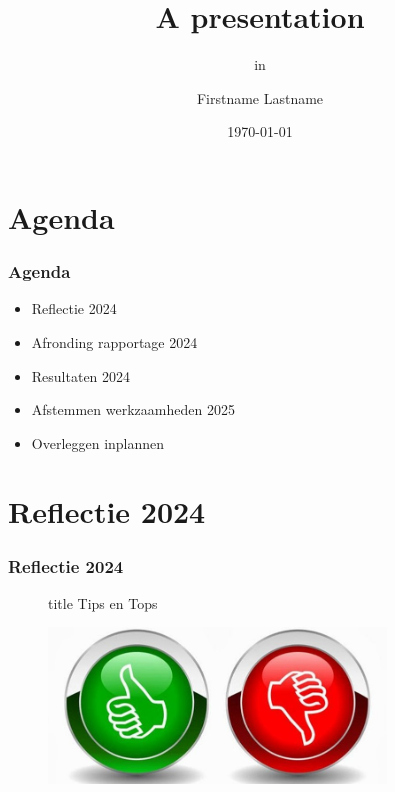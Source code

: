\documentclass[sections, wide]{deltares_presentation}
\title{A presentation}
\subtitle{in \latex}
\author{Firstname Lastname}
\date{\today}
\begin{document}
	

\deltarestitle
\section{Agenda}
\begin{frame}%
\frametitle{Agenda}
\begin{itemize}
	\item Reflectie 2024
	\item Afronding rapportage 2024
	\item Resultaten 2024
	\item Afstemmen werkzaamheden 2025
	\item Overleggen inplannen
\end{itemize}
\end{frame}


\section{Reflectie 2024}
\begin{frame}%
	\frametitle{Reflectie 2024}
\begin{figure}
	\begin{beamercolorbox}[center]{title}
	\huge Tips en Tops
	\end{beamercolorbox}
	\includegraphics[width=0.8\textwidth]{figures/tipsentops2}
	\label{fig:tipsentops2}
\end{figure}
\end{frame}
\end{document}
